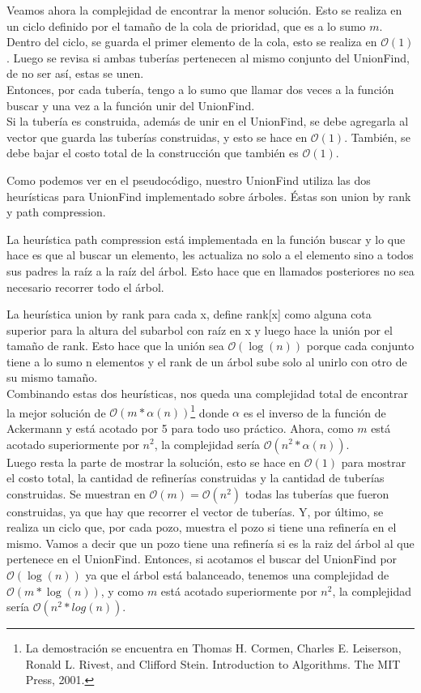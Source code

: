 Veamos ahora la complejidad de encontrar la menor solución. Esto se realiza en un ciclo definido por el tamaño de la cola de prioridad, que es a lo sumo $m$. Dentro del ciclo, se guarda el primer elemento de la cola, esto se realiza en $\mathcal{O}(1)$. Luego se revisa si ambas tuberías pertenecen al mismo conjunto del UnionFind, de no ser así, estas se unen. \\

Entonces, por cada tubería, tengo a lo sumo que llamar dos veces a la función buscar y una vez a la función unir del UnionFind. \\

Si la tubería es construida, además de unir en el UnionFind, se debe agregarla al vector que guarda las tuberías construidas, y esto se hace en $\mathcal{O}(1)$. También, se debe bajar el costo total de la construcción que también es $\mathcal{O}(1)$.

Como podemos ver en el pseudocódigo, nuestro UnionFind utiliza las dos heurísticas para UnionFind implementado sobre árboles. Éstas son union by rank y path compression.

La heurística path compression está implementada en la función buscar y lo que hace es que al buscar un elemento, les actualiza no solo a el elemento sino a todos sus padres la raíz a la raíz del árbol. Esto hace que en llamados posteriores no sea necesario recorrer todo el árbol.

La heurística union by rank para cada x, define rank[x] como alguna
cota superior para la altura del subarbol con raíz en x y luego hace la unión por el tamaño de rank. Esto hace que la unión sea $\mathcal{O}(\log(n))$ porque cada conjunto tiene a lo sumo n elementos y el rank de un árbol sube solo al unirlo con otro de su mismo tamaño. \\

Combinando estas dos heurísticas, nos queda una complejidad total de encontrar la mejor solución de $\mathcal{O}(m*\alpha(n))$\footnote{La demostración se encuentra en Thomas H. Cormen, Charles E. Leiserson, Ronald L. Rivest, and Clifford Stein. Introduction to Algorithms.
The MIT Press, 2001.}
donde $\alpha$ es el inverso de la función de Ackermann y está acotado por 5 para todo uso práctico. Ahora, como $m$ está acotado superiormente por $n^2$, la complejidad sería $\mathcal{O}(n^2*\alpha(n))$.\\


Luego resta la parte de mostrar la solución, esto se hace en $\mathcal{O}(1)$ para mostrar el costo total, la cantidad de refinerías construidas y la cantidad de tuberías construidas. Se muestran en $\mathcal{O}(m) = \mathcal{O}(n^2)$ todas las tuberías que fueron construidas, ya que hay que recorrer el vector de tuberías. Y, por último, se realiza un ciclo que, por cada pozo, muestra el pozo si tiene una refinería en el mismo. Vamos a decir que un pozo tiene una refinería si es la raiz del árbol al que pertenece en el UnionFind. Entonces, si acotamos el buscar del UnionFind por $\mathcal{O}(\log(n))$ ya que el árbol está balanceado, tenemos una complejidad de $\mathcal{O}(m*\log(n))$, y como $m$ está acotado superiormente por $n^2$, la complejidad sería $\mathcal{O}(n^2*log(n))$. \\

